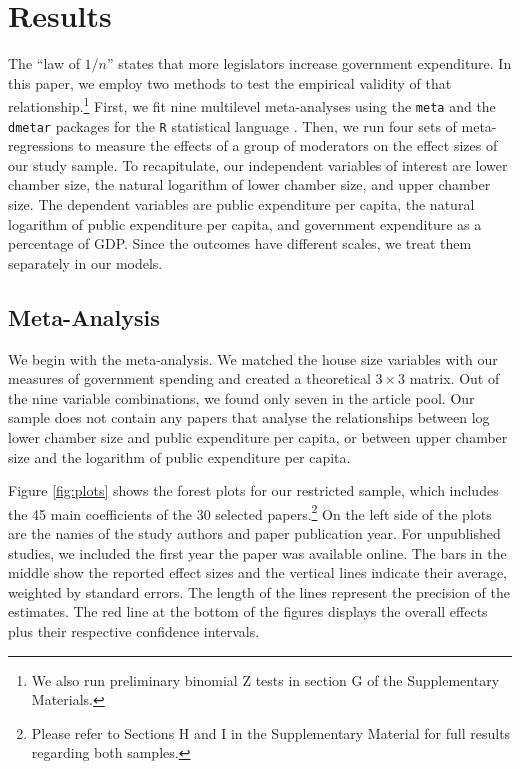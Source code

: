 \documentclass[11pt,a4paper,]{article}
\begin{document}
\hypertarget{results}{%
\section{Results}\label{results}}

The ``law of \(1/n\)'' states that more legislators increase government
expenditure. In this paper, we employ two methods to test the empirical
validity of that
relationship.\footnote{We also run preliminary binomial Z
tests in section G of the Supplementary Materials.} First, we fit nine
multilevel meta-analyses using the \texttt{meta}
\citep{balduzzi2019perform} and the \texttt{dmetar} \citep{dmetar2019}
packages for the \texttt{R} statistical language \citep{rstats2019}.
Then, we run four sets of meta-regressions to measure the effects of a
group of moderators on the effect sizes of our study sample. To
recapitulate, our independent variables of interest are lower chamber
size, the natural logarithm of lower chamber size, and upper chamber
size. The dependent variables are public expenditure per capita, the
natural logarithm of public expenditure per capita, and government
expenditure as a percentage of GDP. Since the outcomes have different
scales, we treat them separately in our models.

\hypertarget{meta-analysis}{%
\subsection{Meta-Analysis}\label{meta-analysis}}

\label{sub:Meta-Analysis}

We begin with the meta-analysis. We matched the house size variables
with our measures of government spending and created a theoretical
\(3 \times 3\) matrix. Out of the nine variable combinations, we found
only seven in the article pool. Our sample does not contain any papers
that analyse the relationships between log lower chamber size and public
expenditure per capita, or between upper chamber size and the logarithm
of public expenditure per capita.

Figure \ref{fig:plots} shows the forest plots for our restricted sample,
which includes the 45 main coefficients of the 30 selected
papers.\footnote{Please refer to Sections H and I in the Supplementary
Material for full results regarding both samples.} On the left side of
the plots are the names of the study authors and paper publication year.
For unpublished studies, we included the first year the paper was
available online. The bars in the middle show the reported effect sizes
and the vertical lines indicate their average, weighted by standard
errors. The length of the lines represent the precision of the
estimates. The red line at the bottom of the figures displays the
overall effects plus their respective confidence intervals.
\end{document}
